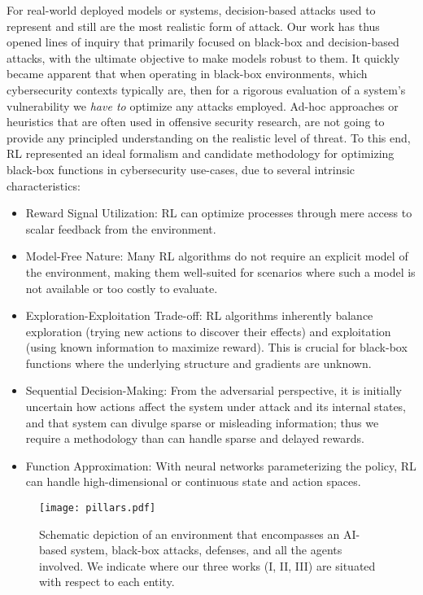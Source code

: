 For real-world deployed models or systems, decision-based attacks used to represent and still are the most realistic form of attack.
Our work has thus opened lines of inquiry that primarily focused on black-box and decision-based attacks, with the ultimate objective to make models robust to them.
It quickly became apparent that when operating in black-box environments, which cybersecurity contexts typically are, then for a rigorous evaluation of a system's vulnerability we \textit{have to} optimize any attacks employed.
Ad-hoc approaches or heuristics that are often used in offensive security research, are not going to provide any principled understanding on the realistic level of threat.
To this end, \gls{RL} represented an ideal formalism and candidate methodology for optimizing black-box functions in cybersecurity use-cases, due to several intrinsic characteristics:

\begin{itemize}
    \item Reward Signal Utilization: RL can optimize processes through mere access to scalar feedback from the environment.
    \item Model-Free Nature: Many RL algorithms do not require an explicit model of the environment, making them well-suited for scenarios where such a model is not available or too costly to evaluate.
    \item Exploration-Exploitation Trade-off: RL algorithms inherently balance exploration (trying new actions to discover their effects) and exploitation (using known information to maximize reward). This is crucial for black-box functions where the underlying structure and gradients are unknown.
    \item Sequential Decision-Making: From the adversarial perspective, it is initially uncertain how actions affect the system under attack and its internal states, and that system can divulge sparse or misleading information; thus we require a methodology than can handle sparse and delayed rewards.
    \item Function Approximation: With neural networks parameterizing the policy, RL can handle high-dimensional or continuous state and action spaces.
\end{itemize}


\begin{figure}
    \centering
    \texttt{[image: pillars.pdf]}
    \caption{Schematic depiction of an environment that encompasses an AI-based system, black-box attacks, defenses, and all the agents involved. We indicate where our three works (I, II, III) are situated with respect to each entity.}
    \label{fig:pillars}
\end{figure}

